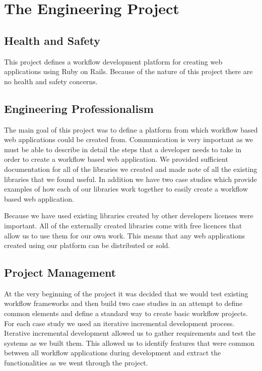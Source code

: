 \documentclass[document.tex]{subfiles}
\begin{document}
\chapter{The Engineering Project}
\label {ch:engineering}

\section{Health and Safety}

This project defines a workflow development platform for creating web applications using Ruby on Rails. Because of the nature of this project there are no health and safety concerns.

\section{Engineering Professionalism}

The main goal of this project was to define a platform from which workflow based web applications could be created from. Communication is very important as we must be able to describe in detail the steps that a developer needs to take in order to create a workflow based web application. We provided sufficient documentation for all of the libraries we created and made note of all the existing libraries that we found useful. In addition we have two case studies which provide examples of how each of our libraries work together to easily create a workflow based web application.

Because we have used existing libraries created by other developers licenses were important. All of the externally created libraries come with free licences that allow us to use them for our own work. This means that any web applications created using our platform can be distributed or sold.

\section{Project Management}

At the very beginning of the project it was decided that we would test existing workflow frameworks and then build two case studies in an attempt to define common elements and define a standard way to create basic workflow projects. For each case study we used an iterative incremental development process. Iterative incremental development allowed us to gather requirements and test the systems as we built them. This allowed us to identify features that were common between all workflow applications during development and extract the functionalities as we went through the project.
\end{document}
